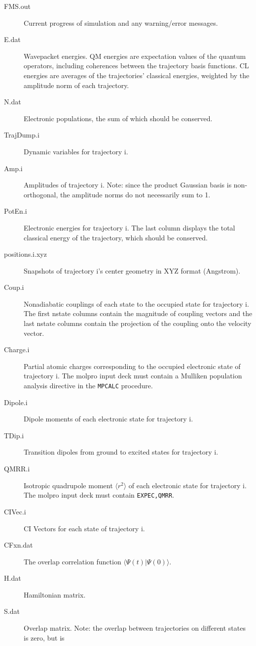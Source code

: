 \documentclass[11pt]{article}
\begin{document}
\begin{description}
\item[FMS.out] Current progress of simulation and any warning/error messages.
\item[E.dat] Wavepacket energies. QM energies are expectation values of the quantum operators, including coherences 
between the trajectory basis functions. CL energies are averages of the trajectories' classical energies, 
weighted by the amplitude norm of each trajectory.
\item[N.dat] Electronic populations, the sum of which should be conserved.
\item[TrajDump.i] Dynamic variables for trajectory i.
\item[Amp.i] Amplitudes of trajectory i. Note: since the product Gaussian basis is non-orthogonal, the amplitude norms do not necessarily sum to 1.
\item[PotEn.i] Electronic energies for trajectory i. The last column displays the total classical energy of the trajectory, which should be conserved.
\item[positions.i.xyz] Snapshots of trajectory i's center geometry in XYZ format (Angstrom).
\item[Coup.i] Nonadiabatic couplings of each state to the occupied state for trajectory i.
The first nstate columns contain the magnitude of coupling vectors and the last nstate columns 
contain the projection of the coupling onto the velocity vector.
\item[Charge.i] Partial atomic charges corresponding to the occupied electronic state of trajectory i. 
The molpro input deck must contain a Mulliken population analysis directive in the {\tt MPCALC} procedure.
\item[Dipole.i] Dipole moments of each electronic state for trajectory i.
\item[TDip.i] Transition dipoles from ground to excited states for trajectory i.
\item[QMRR.i] Isotropic quadrupole moment $\langle r^2 \rangle$ of each electronic state for trajectory i. The molpro
input deck must contain {\tt EXPEC,QMRR}.
\item[CIVec.i] CI Vectors for each state of trajectory i.
\item[CFxn.dat] The overlap correlation function $\langle \Psi(t) | \Psi(0) \rangle$.
\item[H.dat] Hamiltonian matrix.
\item[S.dat] Overlap matrix. Note: the overlap between trajectories on different states is zero, but is

\end{description}
\end{document}
